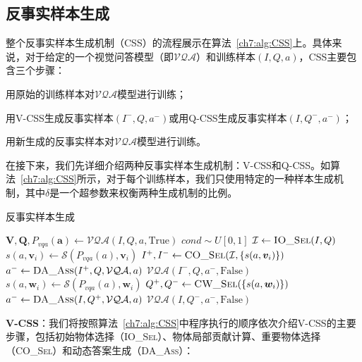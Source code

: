 \subsection{反事实样本生成} 
整个反事实样本生成机制（CSS）的流程展示在算法~\ref{ch7:alg:CSS}上。具体来说，对于给定的一个视觉问答模型（即$\mathcal{VQA}$）和训练样本$(I, Q, a)$，CSS主要包含三个步骤：

\begin{asparaenum}
\item 用原始的训练样本对$\mathcal{VQA}$模型进行训练；

\item 用V-CSS生成反事实样本$(I^-, Q, a^-)$或用Q-CSS生成反事实样本$(I, Q^-, a^-)$；

\item 用新生成的反事实样本对$\mathcal{VQA}$模型进行训练。
\end{asparaenum}

在接下来，我们先详细介绍两种反事实样本生成机制：V-CSS和Q-CSS。如算法~\ref{ch7:alg:CSS}所示，对于每个训练样本，我们只使用特定的一种样本生成机制，其中$\delta$是一个超参数来权衡两种生成机制的比例。


\begin{algorithm}[tbp]
    \caption{反事实样本生成}\label{ch7:alg:CSS}
    \begin{algorithmic}[1]
        \State $ \bm{V}, \bm{Q}, P_{vqa}(\bm{a}) \leftarrow \mathcal{VQA}(I, Q, a, \text{True})$
        \State $ cond \sim U[0, 1]$
          
            \State $ \mathcal{I} \leftarrow  \textsc{IO\_Sel}(I, Q) $
            \State $ s(a, \bm{v}_i) \leftarrow \mathcal{S}(P_{vqa}(a), \bm{v}_i)$
            \State $ I^+, I^- \leftarrow \textsc{CO\_Sel}(\mathcal{I}, \{s(a, \bm{v}_i) \}) $
            \State $ a^- \leftarrow \textsc{DA\_Ass}(I^+, Q, \mathcal{VQA}, a) $
            \State $ \mathcal{VQA}(I^-, Q, a^-, \text{False})$
        \Else {}
            \State $ s(a, \bm{w}_i) \leftarrow \mathcal{S}(P_{vqa}(a), \bm{w}_i) $
            \State $ Q^+, Q^- \leftarrow \textsc{CW\_Sel}(\{s(a, \bm{w}_i)\})$
            \State $ a^- \leftarrow \textsc{DA\_Ass}(I, Q^+, \mathcal{VQA}, a) $
            \State $ \mathcal{VQA}(I, Q^-, a^-, \text{False})$
        \EndIf
        \EndFunction
    \end{algorithmic}
\end{algorithm}


\textbf{V-CSS}：我们将按照算法~\ref{ch7:alg:CSS}中程序执行的顺序依次介绍V-CSS的主要步骤，包括初始物体选择（\textsc{IO\_Sel}）、物体局部贡献计算、重要物体选择（\textsc{CO\_Sel}）和动态答案生成（\textsc{DA\_Ass}）：

